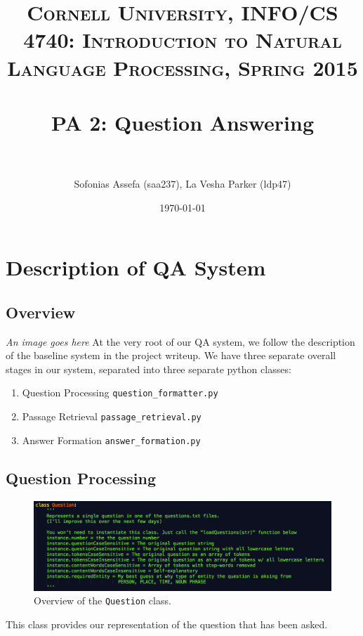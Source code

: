 \documentclass{article}
\title{	
\normalfont \normalsize 
\textsc{Cornell University, INFO/CS 4740: Introduction to Natural Language Processing, Spring 2015} \\
\horrule{0.5pt} \\[0.4cm]
\huge PA 2: Question Answering \\ 
\horrule{2pt} \\[0.5cm]
}
\author{Sofonias Assefa (saa237), La Vesha Parker (ldp47)}
\date{\normalsize\today}
\begin{document}
\maketitle

\section{Description of QA System}
\subsection*{Overview}
\textit{An image goes here}
At the very root of our QA system, we follow the description of the baseline system in the project writeup. We have three separate overall stages in our system, separated into three separate python classes:
\begin{enumerate}
\item Question Processing \texttt{question\_formatter.py}
\item Passage Retrieval \texttt{passage\_retrieval.py}
\item Answer Formation \texttt{answer\_formation.py}
\end{enumerate}

\subsection{Question Processing}
\begin{figure}[h]
    \centering
    \includegraphics[width=1.0\textwidth]{images/question.png}
    \caption{Overview of the \texttt{Question} class.}
\end{figure}

This class provides our representation of the question that has been asked.
\end{document}
